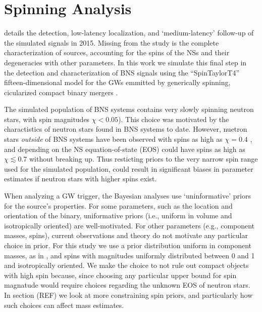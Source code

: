 \section{Spinning Analysis}

\citet{Singer_2014} details the detection, low-latency localization, and `medium-latency' follow-up of the simulated signals in 2015.  Missing from the study is the complete characterization of sources, accounting for the spins of the NSs and their degeneracies with other parameters.  In this work we simulate this final step in the detection and characterization of BNS signals using the ``SpinTaylorT4'' fifteen-dimensional model for the GWs emmitted by generically spinning, cicularized compact binary mergers \cite{Buonanno_2003,Buonanno_2009}. 

The simulated population of BNS systems contains very slowly spinning neutron stars, with spin magnitudes $\chi < 0.05$).  This choice was motivated by the charactistics of neutron stars found in BNS systems to date. However, nuetron stars \emph{outside} of BNS systems have been observed with spins as high as $\chi = 0.4$ \cite{Hessels_2006,Brown_2012}, and depending on the NS equation-of-state (EOS) could have spins as high as $\chi \lesssim 0.7$ \cite{Lo_2011} without breaking up.  Thus resticting priors to the very narrow spin range used for the simulated population, could result in significant biases in parameter estimates if neutron stars with higher spins exist.

When analyzing a GW trigger, the Bayesian analyses use `uninformative' priors for the source's properties.  For some parameters, such as the location and orientation of the binary, uniformative priors (i.e., uniform in volume and isotropically oriented) are well-motivated.  For other parameters (e.g., component masses, spins), current observations and theory do not motivate any particular choice in prior.  For this study we use a prior distribution uniform in component masses, as in \citet{2013arXiv1304.0670L}, and spins with magnitudes uniformly distributed between 0 and 1 and isotropically oriented.  We make the choice to not rule out compact objects with high spin because, since choosing any particular upper bound for spin magnatude would require choices regarding the unknown EOS of neutron stars.  In section (REF) we look at more constraining spin priors, and particularly how such choices can affect mass estimates.